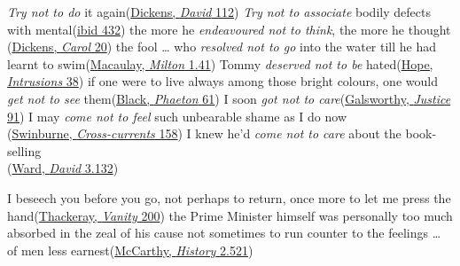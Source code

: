 \ea \label{ex:05-73}
\ea
\textit{Try not to do} it again\hfill(\href{https://archive.org/details/personalhistory05dickgoog/page/n53/mode/2up?q=%22try+not+to+do+it%22&view=theater}{Dickens, \textit{David} 112})
\ex
\textit{Try not to associate} bodily defects with mental\hfill(\href{https://archive.org/details/personalhistory05dickgoog/page/n191/mode/2up?q=%22bodily%22&view=theater}{ibid 432})
\ex
the more he \textit{endeavoured not to think}, the more he thought\\\hfill(\href{https://archive.org/details/christmascarol0000char_h5c8/page/40/mode/2up?q=%22endeavored%22&view=theater}{Dickens, \textit{Carol} 20}) %
\ex
the fool {\dots} who \textit{resolved not to go} into the water till he had learnt to swim\hfill(\href{https://archive.org/details/essaysonmiltona05macagoog/page/n128/mode/2up?view=theater&q=resolved}{Macaulay, \textit{Milton} 1.41}) %
\ex
Tommy \textit{deserved not to be} hated\hfill(\href{https://archive.org/details/intrusionspeggy02hopegoog/page/n46/mode/2up?q=%22deserved+not+to+be%22&view=theater}{Hope, \textit{Intrusions} 38})
\ex
if one were to live always among those bright colours, one would \textit{get not to see} them\hfill(\href{https://archive.org/details/strangeadventure00blac/page/58/mode/2up?view=theater&q=%22among+those+bright+colors%22}{Black, \textit{Phaeton} 61}) %
\ex
I soon \textit{got not to care}\hfill(\href{https://archive.org/details/in.ernet.dli.2015.260707/page/n79/mode/2up?q=%22soon+got+not+to+care%22&view=theater}{Galsworthy, \textit{Justice} 91})
\ex
I may \textit{come not to feel} such unbearable shame as I do now\\\hfill(\href{https://archive.org/details/lovescrosscurren00swinuoft/page/142/mode/2up?q=%22may+come+not+to+feel%22&view=theater}{Swinburne, \textit{Cross-currents} 158})
\ex
I knew he'd \textit{come not to care} about the book-selling\\\hfill(\href{https://archive.org/details/historydavidgri02wardgoog/page/458/mode/2up?q=%22come+not+to+care%22&view=theater}{Ward, \textit{David} 3.132})
\z
\z

\ea \label{ex:05-73a}
\ea
I beseech you before you go, not perhaps to return, once more to let me press the hand\hfill(\href{https://archive.org/details/vanityfairanove03thacgoog/page/n129/mode/2up?q=%22beseech+you+before%22&view=theater}{Thackeray, \textit{Vanity} 200})
\ex
the Prime Minister himself was personally too much absorbed in the zeal of his cause not sometimes to run counter to the feelings {\dots} of men less earnest\hfill(\href{https://books.google.co.jp/books?id=9PjnkXA5jOkC&pg=PP5&dq=%22justin+mccarthy%22+%22our+own+times%22&hl=en&newbks=1&newbks_redir=0&sa=X&ved=2ahUKEwiE2YnrmaCFAxVsoa8BHcesDZwQ6AF6BAgKEAI#v=onepage&q=%22much%20absorbed%22&f=false}{McCarthy, \textit{History} 2.521}) %
\z
\z

